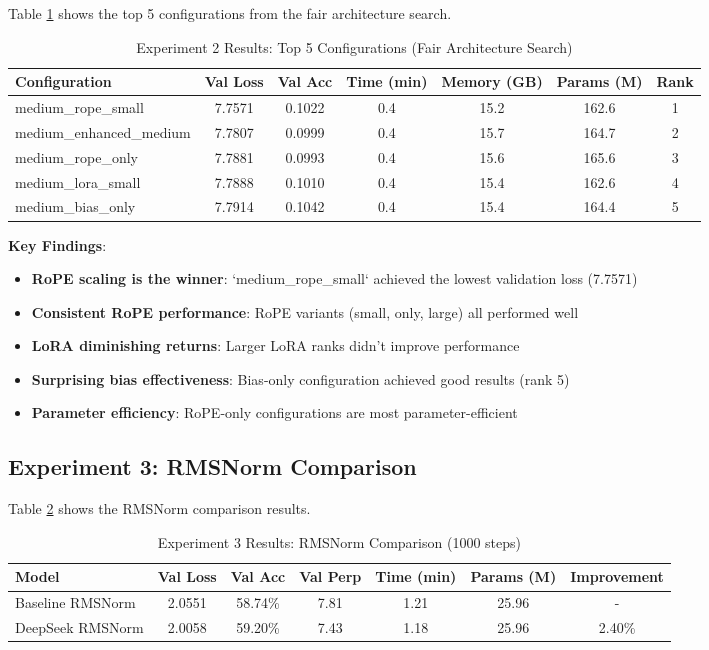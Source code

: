 \documentclass[11pt,a4paper]{article}
\begin{document}
Table \ref{tab:exp2_results} shows the top 5 configurations from the fair architecture search.

\begin{table}[H]
\centering
\caption{Experiment 2 Results: Top 5 Configurations (Fair Architecture Search)}
\label{tab:exp2_results}
\begin{tabular}{@{}lcccccc@{}}
\toprule
Configuration & Val Loss & Val Acc & Time (min) & Memory (GB) & Params (M) & Rank \\
\midrule
medium\_rope\_small & 7.7571 & 0.1022 & 0.4 & 15.2 & 162.6 & 1 \\
medium\_enhanced\_medium & 7.7807 & 0.0999 & 0.4 & 15.7 & 164.7 & 2 \\
medium\_rope\_only & 7.7881 & 0.0993 & 0.4 & 15.6 & 165.6 & 3 \\
medium\_lora\_small & 7.7888 & 0.1010 & 0.4 & 15.4 & 162.6 & 4 \\
medium\_bias\_only & 7.7914 & 0.1042 & 0.4 & 15.4 & 164.4 & 5 \\
\bottomrule
\end{tabular}
\end{table}

\textbf{Key Findings}:
\begin{itemize}
    \item \textbf{RoPE scaling is the winner}: `medium_rope_small` achieved the lowest validation loss (7.7571)
    \item \textbf{Consistent RoPE performance}: RoPE variants (small, only, large) all performed well
    \item \textbf{LoRA diminishing returns}: Larger LoRA ranks didn't improve performance
    \item \textbf{Surprising bias effectiveness}: Bias-only configuration achieved good results (rank 5)
    \item \textbf{Parameter efficiency}: RoPE-only configurations are most parameter-efficient
\end{itemize}

\subsection{Experiment 3: RMSNorm Comparison}

Table \ref{tab:exp3_results} shows the RMSNorm comparison results.

\begin{table}[H]
\centering
\caption{Experiment 3 Results: RMSNorm Comparison (1000 steps)}
\label{tab:exp3_results}
\begin{tabular}{@{}lcccccc@{}}
\toprule
Model & Val Loss & Val Acc & Val Perp & Time (min) & Params (M) & Improvement \\
\midrule
Baseline RMSNorm & 2.0551 & 58.74\% & 7.81 & 1.21 & 25.96 & - \\
DeepSeek RMSNorm & 2.0058 & 59.20\% & 7.43 & 1.18 & 25.96 & 2.40\% \\
\bottomrule
\end{tabular}
\end{table}
\end{document}
